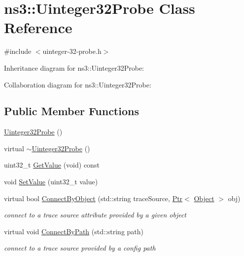\hypertarget{classns3_1_1Uinteger32Probe}{}\section{ns3\+:\+:Uinteger32\+Probe Class Reference}
\label{classns3_1_1Uinteger32Probe}


{\ttfamily \#include $<$uinteger-\/32-\/probe.\+h$>$}



Inheritance diagram for ns3\+:\+:Uinteger32\+Probe\+:


Collaboration diagram for ns3\+:\+:Uinteger32\+Probe\+:
\subsection*{Public Member Functions}
\begin{DoxyCompactItemize}
\item 
\hyperlink{classns3_1_1Uinteger32Probe_a2dd83d00f6f49ae3999c9b64cc22e521}{Uinteger32\+Probe} ()
\item 
virtual \hyperlink{classns3_1_1Uinteger32Probe_a6198e720a25f5ba0d72bddfd575824bc}{$\sim$\+Uinteger32\+Probe} ()
\item 
uint32\+\_\+t \hyperlink{classns3_1_1Uinteger32Probe_a0970a7436d2af0f56f1366fb617d113f}{Get\+Value} (void) const 
\item 
void \hyperlink{classns3_1_1Uinteger32Probe_a424ad1d30e44a360301ba7a7cc9e780d}{Set\+Value} (uint32\+\_\+t value)
\item 
virtual bool \hyperlink{classns3_1_1Uinteger32Probe_ae3e435009ce0d5fd70142a7341f5b979}{Connect\+By\+Object} (std\+::string trace\+Source, \hyperlink{classns3_1_1Ptr}{Ptr}$<$ \hyperlink{classns3_1_1Object}{Object} $>$ obj)
\begin{DoxyCompactList}\small\item\em connect to a trace source attribute provided by a given object \end{DoxyCompactList}\item 
virtual void \hyperlink{classns3_1_1Uinteger32Probe_a3b81bb7d6ab54bad196c9c90823aed08}{Connect\+By\+Path} (std\+::string path)
\begin{DoxyCompactList}\small\item\em connect to a trace source provided by a config path \end{DoxyCompactList}\end{DoxyCompactItemize}
